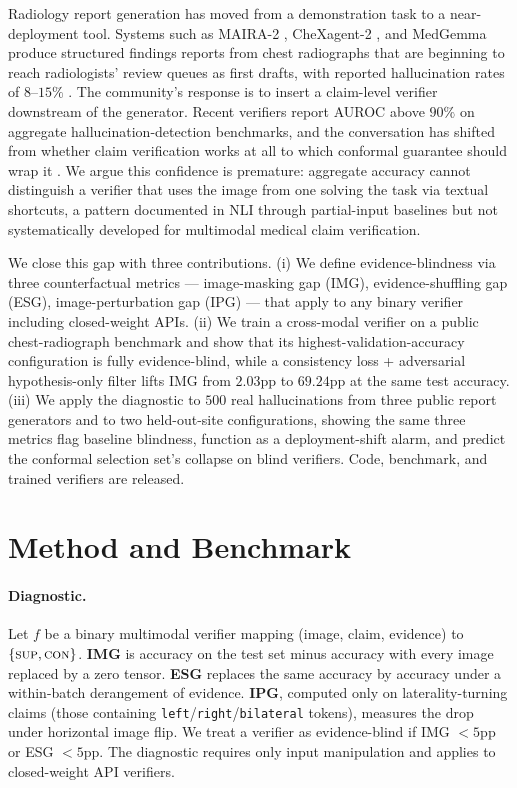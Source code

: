 \documentclass[10pt,twocolumn,letterpaper]{article}
\begin{document}
Radiology report generation has moved from a demonstration task to a near-deployment tool. Systems such as MAIRA-2 \citep{bannur2024maira2}, CheXagent-2 \citep{chen2024chexagent}, and MedGemma \citep{google2025medgemma} produce structured findings reports from chest radiographs that are beginning to reach radiologists' review queues as first drafts, with reported hallucination rates of $8$--$15\%$ \citep{zhang2024radflag,hardy2024rextrust}. The community's response is to insert a claim-level verifier downstream of the generator. Recent verifiers report AUROC above $90\%$ on aggregate hallucination-detection benchmarks, and the conversation has shifted from whether claim verification works at all to which conformal guarantee should wrap it \citep{mohri2024language,angelopoulos2021gentle}. We argue this confidence is premature: aggregate accuracy cannot distinguish a verifier that uses the image from one solving the task via textual shortcuts, a pattern documented in NLI through partial-input baselines \citep{gururangan2018annotation,poliak2018hypothesis} but not systematically developed for multimodal medical claim verification.

We close this gap with three contributions. (i) We define evidence-blindness via three counterfactual metrics --- image-masking gap (IMG), evidence-shuffling gap (ESG), image-perturbation gap (IPG) --- that apply to any binary verifier including closed-weight APIs. (ii) We train a cross-modal verifier on a public chest-radiograph benchmark and show that its highest-validation-accuracy configuration is fully evidence-blind, while a consistency loss + adversarial hypothesis-only filter lifts IMG from $2.03$pp to $69.24$pp at the same test accuracy. (iii) We apply the diagnostic to $500$ real hallucinations from three public report generators and to two held-out-site configurations, showing the same three metrics flag baseline blindness, function as a deployment-shift alarm, and predict the conformal selection set's collapse on blind verifiers. Code, benchmark, and trained verifiers are released.

\section{Method and Benchmark}
\label{sec:method}

\paragraph{Diagnostic.} Let $f$ be a binary multimodal verifier mapping (image, claim, evidence) to $\{\textsc{sup}, \textsc{con}\}$. \textbf{IMG} is accuracy on the test set minus accuracy with every image replaced by a zero tensor. \textbf{ESG} replaces the same accuracy by accuracy under a within-batch derangement of evidence. \textbf{IPG}, computed only on laterality-turning claims (those containing \texttt{left}/\texttt{right}/\texttt{bilateral} tokens), measures the drop under horizontal image flip. We treat a verifier as evidence-blind if IMG $<5$pp or ESG $<5$pp. The diagnostic requires only input manipulation and applies to closed-weight API verifiers.
\end{document}
